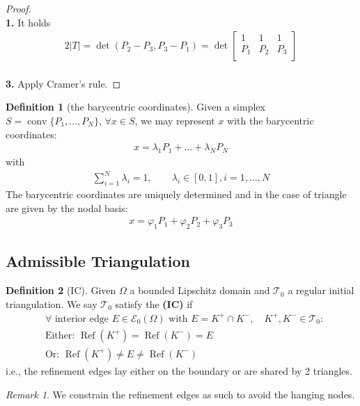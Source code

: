 \documentclass[a4paper,12pt,oneside,fleqn]{book}
\theoremstyle{definition}
\newtheorem{definition}{Definition}[section]
\theoremstyle{remark}
\newtheorem*{remark}{Remark}
\DeclareMathOperator*{\conv}{conv}
\DeclareMathOperator*{\refine}{Ref}
\begin{document}
\begin{proof}
	\quad\\
	\textbf{1.} It holds
	\begin{align*}
		2|T| = \det(P_2 - P_3, P_3 - P_1) = \det
			\begin{bmatrix}
				1 & 1 & 1\\
				P_1 & P_2& P_3\\
			\end{bmatrix}
	\end{align*}
	\\
	\textbf{3.} Apply Cramer's rule.
\end{proof}

\begin{definition}[the barycentric coordinates]
	Given a simplex $S = \conv\{ P_1, \dots, P_N \}$, $\forall x \in S$, we may represent $x$ with the barycentric coordinates:
	\begin{align*}
		x = \lambda_1 P_1 + \dots + \lambda_N P_N
	\end{align*}
	with 
	\begin{align*}
		\sum_{i = 1}^N \lambda_i = 1, \qquad \lambda_i \in [0, 1], i = 1, \dots, N
	\end{align*}
	The barycentric coordinates are uniquely determined and in the case of triangle are given by the nodal basis: 
	\begin{align*}
		x = \varphi_1 P_1 + \varphi_2 P_2 + \varphi_3 P_3
	\end{align*}
\end{definition}



\subsection{Admissible Triangulation}
\begin{definition}[IC]
	Given $\Omega$ a bounded Lipschitz domain and $\mathcal{T}_0$ a regular initial triangulation. We say $\mathcal{T}_0$ satisfy the \textbf{(IC)} if 
	\begin{align*}
		& \forall  \text{ interior edge } E \in \mathcal{E}_0(\Omega) \text{ with } E = K^+ \cap K^-, \quad K^+, K^- \in \mathcal{T}_0: \\
		& \text{Either: } \refine(K^+) = \refine(K^-) = E\\
		& \text{Or: } \refine(K^+) \neq E \neq \refine(K^-) \ 
	\end{align*}
	i.e., the refinement edges lay either on the boundary or are shared by 2 triangles. 
\end{definition}
\begin{remark}
We constrain the refinement edges as such to avoid the hanging nodes. 	
\end{remark}
\end{document}
